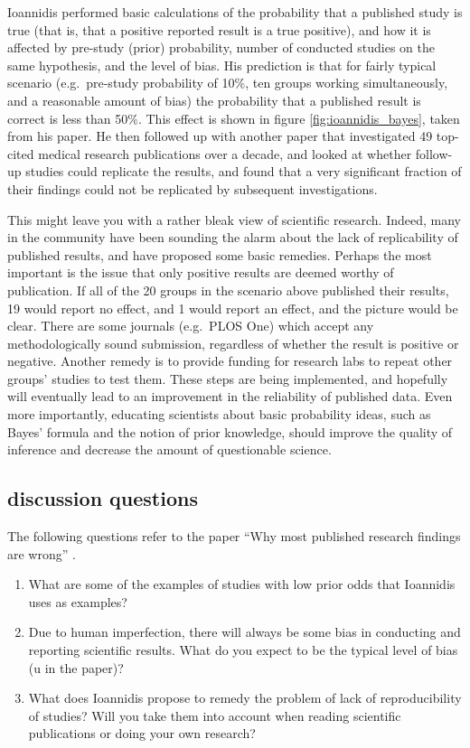 \documentclass[
]{book}
\theoremstyle{definition}
\theoremstyle{definition}
\theoremstyle{definition}
\theoremstyle{remark}
\begin{document}
Ioannidis performed basic calculations of the probability that a published study is true (that is, that a positive reported result is a true positive), and how it is affected by pre-study (prior) probability, number of conducted studies on the same hypothesis, and the level of bias. His prediction is that for fairly typical scenario (e.g.~pre-study probability of 10\%, ten groups working simultaneously, and a reasonable amount of bias) the probability that a published result is correct is less than 50\%. This effect is shown in figure \ref{fig:ioannidis_bayes}, taken from his paper. He then followed up with another paper \citep{ioannidis_ja_contradicted_2005} that investigated 49 top-cited medical research publications over a decade, and looked at whether follow-up studies could replicate the results, and found that a very significant fraction of their findings could not be replicated by subsequent investigations.

This might leave you with a rather bleak view of scientific research. Indeed, many in the community have been sounding the alarm about the lack of replicability of published results, and have proposed some basic remedies. Perhaps the most important is the issue that only positive results are deemed worthy of publication. If all of the 20 groups in the scenario above published their results, 19 would report no effect, and 1 would report an effect, and the picture would be clear. There are some journals (e.g.~PLOS One) which accept any methodologically sound submission, regardless of whether the result is positive or negative. Another remedy is to provide funding for research labs to repeat other groups' studies to test them. These steps are being implemented, and hopefully will eventually lead to an improvement in the reliability of published data. Even more importantly, educating scientists about basic probability ideas, such as Bayes' formula and the notion of prior knowledge, should improve the quality of inference and decrease the amount of questionable science.

\hypertarget{discussion-questions-3}{%
\subsection{discussion questions}\label{discussion-questions-3}}

The following questions refer to the paper ``Why most published research findings are wrong'' \citep{ioannidis_why_2005}.

\begin{enumerate}
\def\labelenumi{\arabic{enumi}.}
\item
  What are some of the examples of studies with low prior odds that Ioannidis uses as examples?
\item
  Due to human imperfection, there will always be some bias in conducting and reporting scientific results. What do you expect to be the typical level of bias (u in the paper)?
\item
  What does Ioannidis propose to remedy the problem of lack of reproducibility of studies? Will you take them into account when reading scientific publications or doing your own research?
\end{enumerate}
\end{document}
